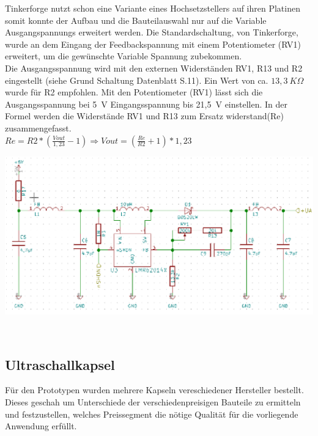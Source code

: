 Tinkerforge nutzt schon eine Variante eines Hochsetzstellers auf ihren Platinen somit konnte der Aufbau und die Bauteilauswahl nur auf die Variable Ausgangspannungs erweitert werden. Die Standardschaltung, von Tinkerforge, wurde an dem Eingang der Feedbackspannung mit einem Potentiometer (RV1) erweitert, um die gewünschte Variable Spannung zubekommen.\\
Die Ausgangsspannung wird mit den externen Widerständen RV1, R13 und R2 eingestellt (siehe Grund Schaltung Datenblatt S.11). Ein Wert von ca. \(\displaystyle 13,3~K\Omega \) wurde für R2 empfohlen. Mit den Potentiometer (RV1) lässt sich die Ausgangsspannung bei 5~V Eingangsspannung bis 21,5~V einstellen. In der Formel werden die Widerstände RV1 und R13 zum Ersatz widerstand(Re) zusammengefasst.
\onehalfspacing \\
\(\displaystyle Re=R2*\left(\frac{Vout}{1,23}-1\right) \Rightarrow Vout=\left(\frac{Re}{R2}+1\right)*1,23\) 
\singlespacing
\begin{center}
\begin{minipage}{0.75\textwidth}
\includegraphics[width=1\textwidth%
]{Abbildungen/Pumpe.png}
\label{fig:Hochsetzsteller}
\end{minipage}\\
\end{center}

\subsection{Ultraschallkapsel}%
Für den Prototypen wurden mehrere Kapseln vereschiedener Hersteller bestellt. Dieses geschah um Unterschiede der verschiedenpreisigen Bauteile zu ermitteln und festzustellen, welches Preissegment die nötige Qualität für die vorliegende Anwendung erfüllt.


